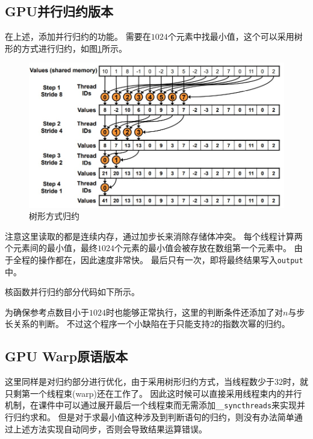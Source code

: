 \documentclass[logo,reportComp]{thesis}
\def\globalmem{\textcolor{black}{\kaiti 全局内存}}
\def\sharedmem{\textcolor{red}{\kaiti 共享内存}}
\begin{document}
\subsection{GPU并行归约版本}
在上述，添加并行归约的功能。
需要在$1024$个元素中找最小值，这个可以采用树形的方式进行归约，如图\ref{fig:reduction}所示。
\begin{figure}[H]
\centering
\includegraphics[width=0.8\linewidth]{fig/reduction.jpg}
\caption{树形方式归约}
\label{fig:reduction}
\end{figure}

注意这里读取的都是连续内存，通过加步长来消除存储体冲突。
每个线程计算两个元素间的最小值，最终$1024$个元素的最小值会被存放在数组第一个元素中。
由于全程的操作都在，因此速度非常快。
最后只有一次，即将最终结果写入\verb'output'中。

核函数并行归约部分代码如下所示。

为确保参考点数目小于$1024$时也能够正常执行，这里的判断条件还添加了对$n$与步长关系的判断。
不过这个程序一个小缺陷在于只能支持$2$的指数次幂的归约。

\subsection{GPU Warp原语版本}
这里同样是对归约部分进行优化，由于采用树形归约方式，当线程数少于$32$时，就只剩第一个线程束(warp)还在工作了。
因此这时候可以直接采用线程束内的并行机制，在课件中可以通过展开最后一个线程束而无需添加\verb'__syncthreads'来实现并行归约求和。
但是对于求最小值这种涉及到判断语句的归约，则没有办法简单通过上述方法实现自动同步，否则会导致结果运算错误。
\end{document}
